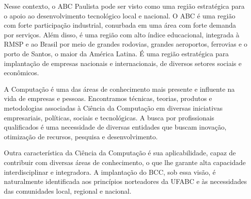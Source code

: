 Nesse contexto, o ABC Paulista pode ser visto como uma região estratégica para
o apoio ao desenvolvimento tecnológico local e nacional.
O ABC é uma região com forte participação industrial, conurbada em uma área com
forte demanda por serviços.
Além disso, é uma região com alto índice educacional, integrada à RMSP e ao
Brasil por meio de grandes rodovias, grandes aeroportos, ferrovias e o porto de
Santos, o maior da América Latina.
É uma região estratégica para implantação de empresas nacionais e
internacionais, de diversos setores sociais e econômicos.

A Computação é uma das áreas de conhecimento mais presente e influente na vida
de empresas e pessoas.
Encontramos técnicas, teorias, produtos e metodologias associadas à Ciência da
Computação em diversas iniciativas empresariais, políticas, sociais e
tecnológicas.
A busca por profissionais qualificados é uma necessidade de diversas entidades
que buscam inovação, otimização de recursos, pesquisa e desenvolvimento.

Outra característica da Ciência da Computação é sua aplicabilidade, capaz de
contribuir com diversas áreas de conhecimento, o que lhe garante alta
capacidade interdisciplinar e integradora.
A implantação do BCC, sob essa visão, é naturalmente identificada aos
princípios norteadores da UFABC e às necessidades das comunidades local,
regional e nacional.


